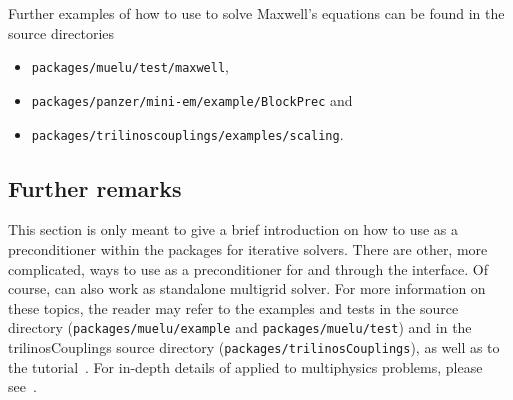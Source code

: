 Further examples of how to use \muelu to solve Maxwell's equations can be found in the \trilinos source directories
\begin{itemize}
  \setlength{\itemsep}{-10pt}
\item \texttt{packages/muelu/test/maxwell},
\item \texttt{packages/panzer/mini-em/example/BlockPrec} and
\item \texttt{packages/trilinoscouplings/examples/scaling}.
\end{itemize}




\subsection{Further remarks}

This section is only meant to give a brief introduction on how to use \muelu{}
as a preconditioner within the \trilinos{} packages for iterative solvers. There
are other, more complicated, ways to use \muelu{} as a preconditioner for \belos
and \aztecoo through the \xpetra interface. Of course, \muelu{} can also work as
standalone multigrid solver. For more information on these topics, the reader
may refer to the examples and tests in the \muelu{} source directory
(\texttt{packages/muelu/example} and \texttt{packages/muelu/test}) and in the trilinosCouplings source directory
(\texttt{packages/trilinosCouplings}), as well as to the \muelu{}
tutorial~\cite{MueLuTutorial}.
For in-depth details of \muelu applied to multiphysics problems, please see~\cite{Wiesner2014}.

